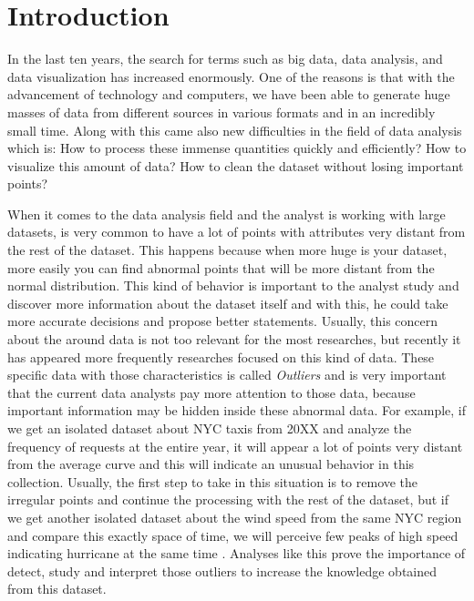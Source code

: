 \chapter{Introduction}


In the last ten years, the search for terms such as big data, data analysis, and
data visualization has increased enormously. One of the reasons is that with the
advancement of technology and computers, we have been able to generate huge masses
of data from different sources in various formats and in an incredibly small time.
Along with this came also new difficulties in the field of data analysis which is:
How to process these immense quantities quickly and efficiently? How to visualize
this amount of data? How to clean the dataset without losing important points?

When it comes to the data analysis field and the analyst is working with large
datasets, is very common to have a lot of points with attributes very distant from
the rest of the dataset. This happens because when more huge is your dataset, more
easily you can find abnormal points that will be more distant from the normal
distribution. This kind of behavior is important to the analyst study and discover
more information about the dataset itself and with this, he could take more accurate
decisions and propose better statements. Usually, this concern about the around data
is not too relevant for the most researches, but recently it has appeared more frequently
researches focused on this kind of data. These specific data with those characteristics
is called \textit{Outliers} and is very important that the current data analysts
pay more attention to those data, because important information may be hidden inside
these abnormal data. For example, if we get an isolated dataset about NYC taxis from
20XX and analyze the frequency of requests at the entire year, it will appear a lot
of points very distant from the average curve and this will indicate an unusual behavior
in this collection. Usually, the first step to take in this situation is to remove the
irregular points and continue the processing with the rest of the dataset, but if we get
another isolated dataset about the wind speed from the same NYC region and compare this
exactly space of time, we will perceive few peaks of high speed indicating hurricane at
the same time \cite{DBLP:journals/debu/FreireCVZ16}. Analyses like this prove the
importance of detect, study and interpret those outliers to increase the knowledge
obtained from this dataset.


